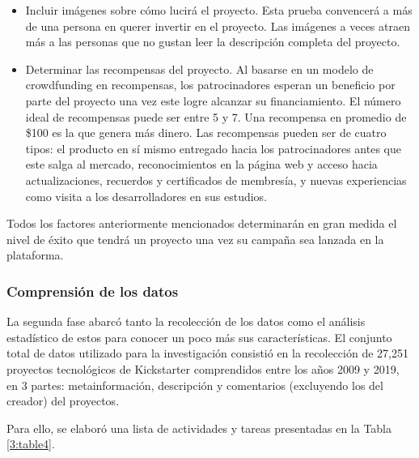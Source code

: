 \begin{itemize}
	\item Incluir imágenes sobre cómo lucirá el proyecto. Esta prueba convencerá a más de una persona en querer invertir en el proyecto. Las imágenes a veces atraen más a las personas que no gustan leer la descripción completa del proyecto.
	\item Determinar las recompensas del proyecto. Al basarse en un modelo de crowdfunding en recompensas, los patrocinadores esperan un beneficio por parte del proyecto una vez este logre alcanzar su financiamiento. El número ideal de recompensas puede ser entre 5 y 7. Una recompensa en promedio de \$100 es la que genera más dinero. Las recompensas pueden ser de cuatro tipos: el producto en sí mismo entregado hacia los patrocinadores antes que este salga al mercado, reconocimientos en la página web y acceso hacia actualizaciones, recuerdos y certificados de membresía, y nuevas experiencias como visita a los desarrolladores en sus estudios.
\end{itemize}

Todos los factores anteriormente mencionados determinarán en gran medida el nivel de éxito que tendrá un proyecto una vez su campaña sea lanzada en la plataforma.

\subsubsection{Comprensión de los datos}
La segunda fase abarcó tanto la recolección de los datos como el análisis estadístico de estos para conocer un poco más sus características. El conjunto total de datos utilizado para la investigación consistió en la recolección de 27,251 proyectos tecnológicos de Kickstarter comprendidos entre los años 2009 y 2019, en 3 partes: metainformación, descripción y comentarios (excluyendo los del creador) del proyectos.

Para ello, se elaboró una lista de actividades y tareas presentadas en la Tabla \ref{3:table4}.

